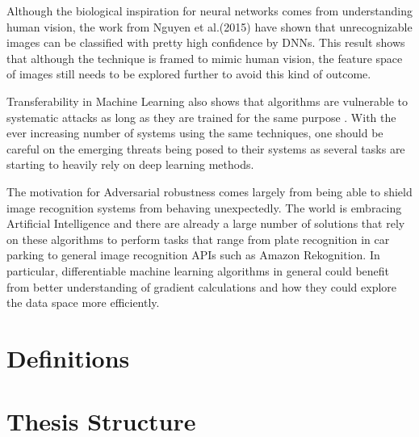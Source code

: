 Although the biological inspiration for neural networks comes from understanding human vision, the work from Nguyen et al.(2015) \cite{nguyen2015} have shown that unrecognizable images can be classified with pretty high confidence by DNNs. This result shows that although the technique is framed to mimic human vision, the feature space of images still needs to be explored further to avoid this kind of outcome.

Transferability in Machine Learning also shows that algorithms are vulnerable to systematic attacks as long as they are trained for the same purpose \cite{papernot2016transf}. With the ever increasing number of systems using the same techniques, one should be careful on the emerging threats being posed to their systems as several tasks are starting to heavily rely on deep learning methods.

The motivation for Adversarial robustness comes largely from being able to shield image recognition systems from behaving unexpectedly. The world is embracing Artificial Intelligence and there are already a large number of solutions that rely on these algorithms to perform tasks that range from plate recognition in car parking to general image recognition APIs such as Amazon Rekognition. In particular, differentiable machine learning algorithms in general could benefit from better understanding of gradient calculations and how they could explore the data space more efficiently.

\section{Definitions}


\section{Thesis Structure}


